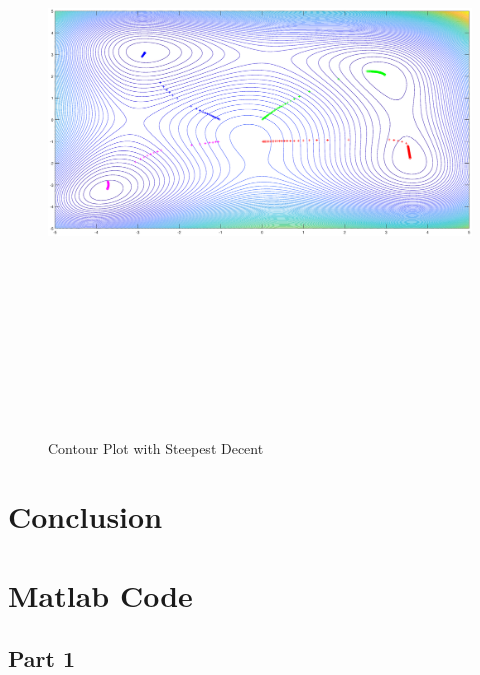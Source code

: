 \documentclass[12pt]{article}
\begin{document}
\begin{landscape}
\begin{figure}[h!]
    \centering
    \includegraphics[width=9in,height=6.5in]{SDM_Contour.eps}
    \caption{Contour Plot with Steepest Decent}
    \label{fig:SDM_Contour}
\end{figure}
\end{landscape}
\pagebreak
\section{Conclusion}

\pagebreak

\appendix
\section{Matlab Code}
\subsection{Part 1}






\end{document}

